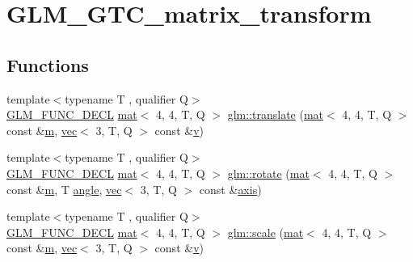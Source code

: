 \hypertarget{group__gtc__matrix__transform}{}\section{G\+L\+M\+\_\+\+G\+T\+C\+\_\+matrix\+\_\+transform}
\label{group__gtc__matrix__transform}
\subsection*{Functions}
\begin{DoxyCompactItemize}
\item 
{\footnotesize template$<$typename T , qualifier Q$>$ }\\\mbox{\hyperlink{setup_8hpp_ab2d052de21a70539923e9bcbf6e83a51}{G\+L\+M\+\_\+\+F\+U\+N\+C\+\_\+\+D\+E\+CL}} \mbox{\hyperlink{structglm_1_1mat}{mat}}$<$ 4, 4, T, Q $>$ \mbox{\hyperlink{group__gtc__matrix__transform_ga1a4ecc4ad82652b8fb14dcb087879284}{glm\+::translate}} (\mbox{\hyperlink{structglm_1_1mat}{mat}}$<$ 4, 4, T, Q $>$ const \&\mbox{\hyperlink{_s_d_l__opengl__glext_8h_af593500c283bf1a787a6f947f503a5c2}{m}}, \mbox{\hyperlink{structglm_1_1vec}{vec}}$<$ 3, T, Q $>$ const \&\mbox{\hyperlink{_s_d_l__opengl_8h_a10a82eabcb59d2fcd74acee063775f90}{v}})
\item 
{\footnotesize template$<$typename T , qualifier Q$>$ }\\\mbox{\hyperlink{setup_8hpp_ab2d052de21a70539923e9bcbf6e83a51}{G\+L\+M\+\_\+\+F\+U\+N\+C\+\_\+\+D\+E\+CL}} \mbox{\hyperlink{structglm_1_1mat}{mat}}$<$ 4, 4, T, Q $>$ \mbox{\hyperlink{group__gtc__matrix__transform_gaee9e865eaa9776370996da2940873fd4}{glm\+::rotate}} (\mbox{\hyperlink{structglm_1_1mat}{mat}}$<$ 4, 4, T, Q $>$ const \&\mbox{\hyperlink{_s_d_l__opengl__glext_8h_af593500c283bf1a787a6f947f503a5c2}{m}}, T \mbox{\hyperlink{_s_d_l__opengl__glext_8h_a9e06c1f76a20fed54ca742cd25cb02c4}{angle}}, \mbox{\hyperlink{structglm_1_1vec}{vec}}$<$ 3, T, Q $>$ const \&\mbox{\hyperlink{group__gtc__quaternion_gaaf2707d3081789ce097daaa6e54d5287}{axis}})
\item 
{\footnotesize template$<$typename T , qualifier Q$>$ }\\\mbox{\hyperlink{setup_8hpp_ab2d052de21a70539923e9bcbf6e83a51}{G\+L\+M\+\_\+\+F\+U\+N\+C\+\_\+\+D\+E\+CL}} \mbox{\hyperlink{structglm_1_1mat}{mat}}$<$ 4, 4, T, Q $>$ \mbox{\hyperlink{group__gtc__matrix__transform_ga05051adbee603fb3c5095d8cf5cc229b}{glm\+::scale}} (\mbox{\hyperlink{structglm_1_1mat}{mat}}$<$ 4, 4, T, Q $>$ const \&\mbox{\hyperlink{_s_d_l__opengl__glext_8h_af593500c283bf1a787a6f947f503a5c2}{m}}, \mbox{\hyperlink{structglm_1_1vec}{vec}}$<$ 3, T, Q $>$ const \&\mbox{\hyperlink{_s_d_l__opengl_8h_a10a82eabcb59d2fcd74acee063775f90}{v}})

\end{DoxyCompactItemize}
